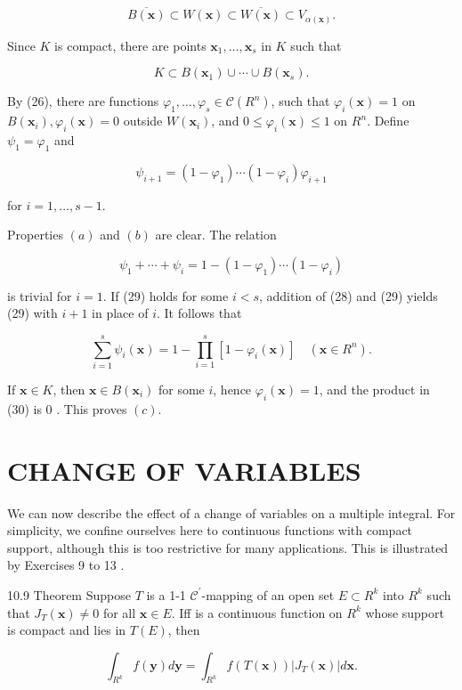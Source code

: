 \documentclass[10pt]{article}
\begin{document}
$$
\overline{B(\mathbf{x})} \subset W(\mathbf{x}) \subset \overline{W(\mathbf{x})} \subset V_{\alpha(\mathbf{x})} .
$$

Since $K$ is compact, there are points $\mathbf{x}_{1}, \ldots, \mathbf{x}_{s}$ in $K$ such that

$$
K \subset B\left(\mathbf{x}_{1}\right) \cup \cdots \cup B\left(\mathbf{x}_{s}\right) .
$$

By (26), there are functions $\varphi_{1}, \ldots, \varphi_{s} \in \mathscr{C}\left(R^{n}\right)$, such that $\varphi_{i}(\mathbf{x})=1$ on $B\left(\mathbf{x}_{i}\right), \varphi_{i}(\mathbf{x})=0$ outside $W\left(\mathbf{x}_{i}\right)$, and $0 \leq \varphi_{i}(\mathbf{x}) \leq 1$ on $R^{n}$. Define $\psi_{1}=\varphi_{1}$ and

$$
\psi_{i+1}=\left(1-\varphi_{1}\right) \cdots\left(1-\varphi_{i}\right) \varphi_{i+1}
$$

for $i=1, \ldots, s-1$.

Properties $(a)$ and $(b)$ are clear. The relation

$$
\psi_{1}+\cdots+\psi_{i}=1-\left(1-\varphi_{1}\right) \cdots\left(1-\varphi_{i}\right)
$$

is trivial for $i=1$. If (29) holds for some $i<s$, addition of (28) and (29) yields (29) with $i+1$ in place of $i$. It follows that

$$
\sum_{i=1}^{s} \psi_{i}(\mathbf{x})=1-\prod_{i=1}^{s}\left[1-\varphi_{i}(\mathbf{x})\right] \quad\left(\mathbf{x} \in R^{n}\right) .
$$

If $\mathbf{x} \in K$, then $\mathbf{x} \in B\left(\mathbf{x}_{i}\right)$ for some $i$, hence $\varphi_{i}(\mathbf{x})=1$, and the product in (30) is 0 . This proves $(c)$.

\section{CHANGE OF VARIABLES}
We can now describe the effect of a change of variables on a multiple integral. For simplicity, we confine ourselves here to continuous functions with compact support, although this is too restrictive for many applications. This is illustrated by Exercises 9 to 13 .

10.9 Theorem Suppose $T$ is a 1-1 $\mathscr{C}^{\prime}$-mapping of an open set $E \subset R^{k}$ into $R^{k}$ such that $J_{T}(\mathbf{x}) \neq 0$ for all $\mathbf{x} \in E$. Iff is a continuous function on $R^{k}$ whose support is compact and lies in $T(E)$, then

$$
\int_{R^{k}} f(\mathbf{y}) d \mathbf{y}=\int_{R^{k}} f(T(\mathbf{x}))\left|J_{T}(\mathbf{x})\right| d \mathbf{x} .
$$
\end{document}
